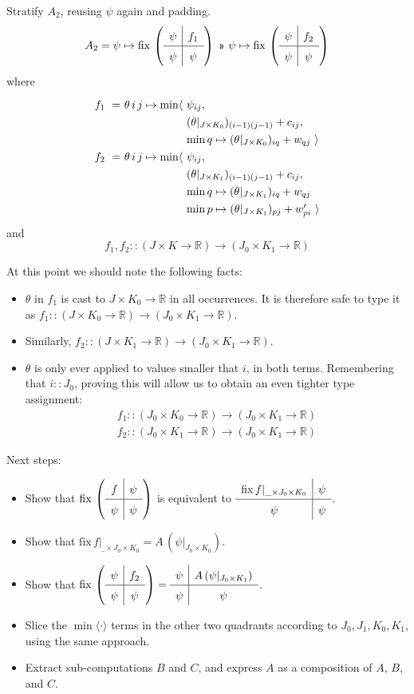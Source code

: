 \documentclass{article}
\newcommand\R{\mathbb{R}}
\begin{document}
Stratify $A_2$, reusing $\psi$ again and padding.
%
\[A_2 = \psi\mapsto\mathrm{fix}\,\left(\quadrants{\psi}{f_1}{\psi}{\psi}\right) ~\applt~
        \psi\mapsto\mathrm{fix}\,\left(\quadrants{\psi}{f_2}{\psi}{\psi}\right)
 \]
 where
 \[\renewcommand\arraystretch{1.3}
   \begin{array}{r@{}l@{}l}
   f_1 ~=~ & \theta\,i\,j \mapsto \min\langle~
        & \psi_{ij}, \\
    & & (\theta|_{J\times K_0})_{(i-1)(j-1)} + c_{ij}, \\
    & & \min q\mapsto (\theta|_{J\times K_0})_{iq} + w_{qj}~\rangle \\
    f_2 ~=~ & \theta\,i\,j \mapsto\min\langle~
        & \psi_{ij}, \\
    & & (\theta|_{J\times K_1})_{(i-1)(j-1)} + c_{ij}, \\
    & & \min q\mapsto (\theta|_{J\times K_1})_{iq} + w_{qj} \\
    & & \min p\mapsto (\theta|_{J\times K_1})_{pj} + w'_{pi}~\rangle
 \end{array}
 \]
%
and \[f_1,f_2 :: (J\times K\to\R) \to (J_0\times K_1\to\R)\]

\bigskip
At this point we should note the following facts:
\begin{itemize}
  \item $\theta$ in $f_1$ is cast to $J\times K_0\to\R$ in all occurrences. 
   It is therefore safe to type it as $f_1 :: (J\times K_0\to\R) \to (J_0\times K_1\to\R)$.
  \item Similarly, $f_2 :: (J\times K_1\to\R) \to (J_0\times K_1\to\R)$.
  \item $\theta$ is only ever applied to values smaller that $i$, in both terms. Remembering that $i :: J_0$,
    proving this will allow us to obtain an even tighter type assignment:
    \[\renewcommand\arraystretch{1.5}
      \begin{array}{l}
       f_1 :: (J_0\times K_0\to\R) \to (J_0\times K_1\to\R) \\
       f_2 :: (J_0\times K_1\to\R) \to (J_0\times K_1\to\R)
      \end{array}\]
\end{itemize}

\bigskip
Next steps:
\begin{itemize}
  \item Show that $\mathrm{fix}\,\left(\quadrants{f}{\psi}{\psi}{\psi}\right)$
    is equivalent to $\quadrants{\mathrm{fix}\,f|_{\_\times J_0\times K_0}}{\psi}{\psi}{\psi}$.
  \item Show that $\mathrm{fix}\,f|_{\_\times J_0\times K_0} = A\,(\psi|_{J_0\times K_0})$.
  \item Show that $\mathrm{fix}\,\left(\quadrants{\psi}{f_2}{\psi}{\psi}\right) = 
                   \quadrants{\psi}{A\,(\psi|_{J_0\times K_1})}{\psi}{\psi}$.
  \item Slice the $\min\langle\cdot\rangle$ terms in the other two quadrants
    according to $J_0,J_1,K_0,K_1$, using the same approach.
  \item Extract sub-computations $B$ and $C$, and express $A$ as a composition of $A$, $B$, and $C$.
\end{itemize}



\end{document}

